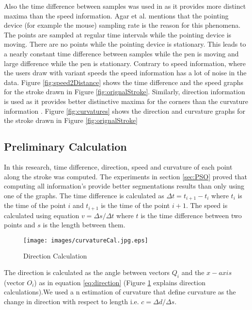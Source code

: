 Also the time difference between samples was used in \cite{polygonfeedback31} as it provides more distinct maxima than the speed information. Agar et al. \cite{polygonfeedback31} mentions that the pointing device (for example the mouse) sampling rate is the reason for this phenomena. The points are sampled at regular time intervals while the pointing device is moving. There are no points while the pointing device is stationary. This leads to a nearly constant time difference between samples while the pen is moving and large difference while the pen is stationary. Contrary to speed information, where the users draw with variant speeds the speed information has a lot of noise in the data. Figure \ref{fig:speed2Distance} shows the time difference and the speed graphs for the stroke drawn in Figure \ref{fig:orignalStroke}.  Similarly, direction information is used as it provides better distinctive maxima for the corners than the curvature information \cite{meanshift10}. Figure \ref{fig:curvatures} shows the direction and curvature graphs for the stroke drawn in Figure \ref{fig:orignalStroke}

\subsection{Preliminary Calculation}
\label{sec:CurvatureCalculation}
  
 
 In this research, time difference, direction, speed and curvature of each point along the stroke was computed. The experiments in section \ref{sec:PSO} proved that computing all information's provide better segmentations results than only using one of the graphs. The time difference is calculated as $\Delta t = t_{i+1} - t_i$ where $t_i$ is the time of the point $i$ and $t_{i+1}$ is the time of the point $i+1$. The speed is calculated using equation $v=\Delta s/\Delta t$ where $t$ is the time difference between two points and $s$ is the length between them. 
 
\begin{figure}
	\centering
		\texttt{[image: images/curvatureCal.jpg.eps]}
	\caption{Direction Calculation}
	\label{fig:curvatureCal.jpg}
\end{figure}

  The direction is calculated as the angle between vectors $Q_i$ and the $x-axis$ (vector $O_i$) as in equation \ref{eq:direction} (Figure \ref{fig:curvatureCal.jpg} explains direction calculations).We used a n estimation of curvature that define curvature as the change in direction with respect to length i.e. $c= \Delta d/\Delta s$.
  

